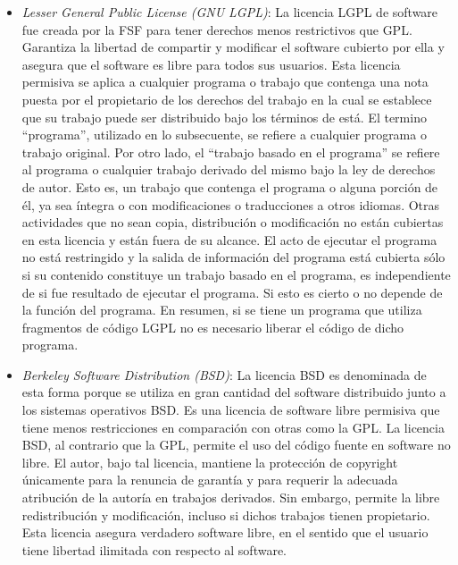 \begin {itemize}
\item \textit{Lesser General Public License (GNU LGPL)}: La licencia
  LGPL de software fue creada por la FSF para tener derechos menos
  restrictivos que GPL. Garantiza la libertad de compartir y modificar
  el software cubierto por ella y asegura que el software es libre
  para todos sus usuarios. Esta licencia permisiva se aplica a
  cualquier programa o trabajo que contenga una nota puesta por el
  propietario de los derechos del trabajo en la cual se establece que
  su trabajo puede ser distribuido bajo los términos de está. El
  termino ``programa'', utilizado en lo subsecuente, se refiere a
  cualquier programa o trabajo original. Por otro lado, el ``trabajo
  basado en el programa'' se refiere al programa o cualquier trabajo
  derivado del mismo bajo la ley de derechos de autor. Esto es, un
  trabajo que contenga el programa o alguna porción de él, ya sea
  íntegra o con modificaciones o traducciones a otros idiomas. Otras
  actividades que no sean copia, distribución o modificación no están
  cubiertas en esta licencia y están fuera de su alcance. El acto de
  ejecutar el programa no está restringido y la salida de información
  del programa está cubierta sólo si su contenido constituye un
  trabajo basado en el programa, es independiente de si fue resultado
  de ejecutar el programa. Si esto es cierto o no depende de la
  función del programa. En resumen, si se tiene un programa que
  utiliza fragmentos de código LGPL no es necesario liberar el código
  de dicho programa.

\item \textit{Berkeley Software Distribution (BSD)}: La licencia BSD
  es denominada de esta forma porque se utiliza en gran cantidad del
  software distribuido junto a los sistemas operativos BSD. Es una
  licencia de software libre permisiva que tiene menos restricciones
  en comparación con otras como la GPL. La licencia BSD, al contrario
  que la GPL, permite el uso del código fuente en software no
  libre. El autor, bajo tal licencia, mantiene la protección de
  copyright únicamente para la renuncia de garantía y para requerir la
  adecuada atribución de la autoría en trabajos derivados. Sin
  embargo, permite la libre redistribución y modificación, incluso si
  dichos trabajos tienen propietario. Esta licencia asegura verdadero
  software libre, en el sentido que el usuario tiene libertad
  ilimitada con respecto al software.
\end {itemize}



